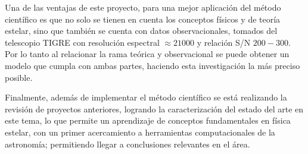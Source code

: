 \documentclass[12pt,oneside,openany,letter]{book}
\begin{document}

\vspace{2mm}

\noindent Una de las ventajas de este proyecto, para una mejor aplicación del método científico es que no solo se tienen en cuenta los conceptos físicos y de teoría estelar, sino que también se cuenta con datos observacionales, tomados del telescopio TIGRE \citep{schmitt2014tigre} con resolución espectral $\approx 21000$ y relación S/N $200-300$. Por lo tanto al relacionar la rama teórica y observacional se puede obtener un modelo que cumpla con ambas partes, haciendo esta investigación la más preciso posible.

\noindent Finalmente, además de implementar el método científico se está realizando la revisión de proyectos anteriores, logrando la caracterización del estado del arte en este tema, lo que permite un aprendizaje de conceptos fundamentales en física estelar, con un primer acercamiento a herramientas computacionales de la astronomía; permitiendo llegar a conclusiones relevantes en el área.
\end{document}
